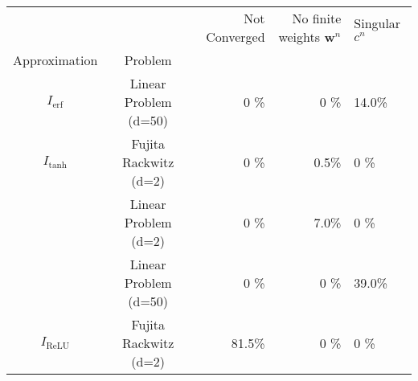 \begin{tabular}{ccrRP}
 &  & Not Converged & No finite weights $\bm{{w}}^n$ & Singular $c^n$ \\
Approximation & Problem &  &  &  \\
$I_\text{erf}$ & Linear Problem (d=50) & 0 \% & 0 \% & 14.0\% \\
$I_\text{tanh}$ & Fujita Rackwitz (d=2) & 0 \% & 0.5\% & 0 \% \\
 & Linear Problem (d=2) & 0 \% & 7.0\% & 0 \% \\
 & Linear Problem (d=50) & 0 \% & 0 \% & 39.0\% \\
$I_\text{ReLU}$ & Fujita Rackwitz (d=2) & 81.5\% & 0 \% & 0 \% \\
\end{tabular}
